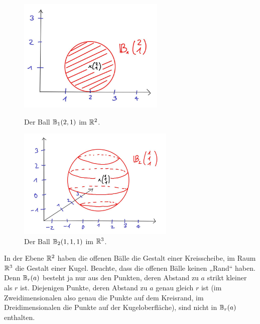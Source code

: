 \begin{figure}[ht]
    \begin{minipage}{.48\textwidth}
        \includegraphics[width=7cm]{./_img/2Dball.jpeg}
        \centering \caption{Der Ball $\mathbb B_1(2,1)$ im $\mathbb R^2$.}
    \end{minipage}
    \quad
    \begin{minipage}{.48\textwidth}
        \includegraphics[width=7.5cm]{./_img/3Dball.jpeg}
        \centering \caption{Der Ball $\mathbb B_2(1,1,1)$ im $\mathbb R^3$.}
    \end{minipage}
\end{figure}


\begin{bsp}
    In der Ebene $\mathbb R^2$ haben die offenen Bälle die Gestalt einer Kreisscheibe, im Raum $\mathbb R^3$ die Gestalt einer Kugel. Beachte, dass die offenen Bälle keinen „Rand“ haben. Denn $\mathbb B_r(a)$ besteht ja nur aus den Punkten, deren Abstand zu $a$ strikt kleiner als $r$ ist. Diejenigen Punkte, deren Abstand zu $a$ genau gleich $r$ ist (im Zweidimensionalen also genau die Punkte auf dem Kreisrand, im Dreidimensionalen die Punkte auf der Kugeloberfläche), sind nicht in $\mathbb B_r(a)$ enthalten.
\end{bsp}


